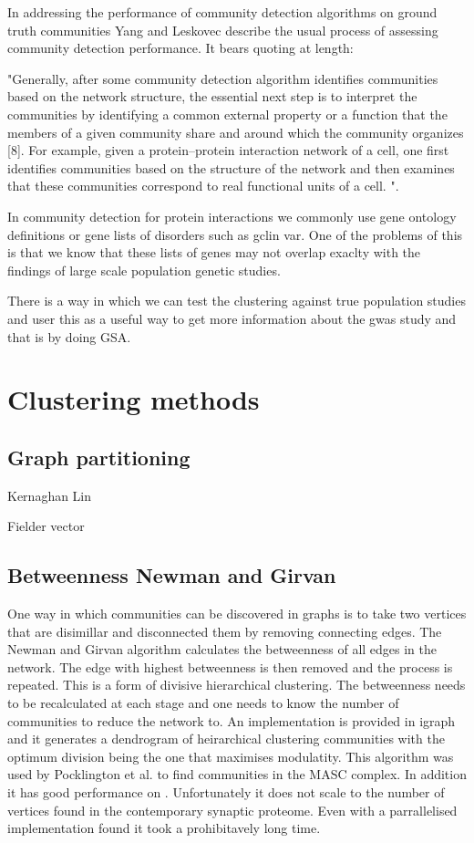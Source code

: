 In addressing the performance of community detection algorithms on ground truth communities Yang and Leskovec describe the usual process of assessing community detection performance. It bears quoting at length:

"Generally, after some community detection algorithm identifies communities based on the network structure, the essential next step is to interpret the communities by identifying a common external property or a function that the members of a given community share and around which the community organizes [8]. For example, given a protein–protein interaction network of a cell, one first identifies communities based on the structure of the network and then examines that these communities correspond to real functional units of a cell. ". \cite{yang2015defining}

In community detection for protein interactions we commonly use gene ontology definitions or gene lists of disorders such as gclin var. One of the problems of this is that we know that these lists of genes may not overlap exaclty with the findings of large scale population genetic studies. 

There is a way in which we can test the clustering against true population studies and user this as a useful way to get more information about the gwas study and that is by doing GSA.


\section{Clustering methods}

\subsection{Graph partitioning}
Kernaghan Lin

Fielder vector

\subsection{Betweenness Newman and Girvan}
One way in which communities can be discovered in graphs is to take two vertices that are
disimillar and disconnected them by removing connecting edges.
The Newman and Girvan algorithm \cite{newman2004finding}  calculates the betweenness
of all edges in the network. The edge with highest betweenness is then removed and the
process is repeated. This is a form of divisive hierarchical clustering. The betweenness
needs to be recalculated at each stage and one needs to know the number of communities
to reduce the network to. An implementation is provided in igraph and it generates a dendrogram of heirarchical clustering communities with the optimum division being the one that maximises modulatity. This algorithm was used by Pocklington et al. \cite{pocklington2006proteomes} to find
communities in the MASC complex. In addition it has good performance on . Unfortunately it does not scale to the number of
vertices found in the contemporary synaptic proteome. Even with a parrallelised implementation found it took a prohibitavely long time. 

